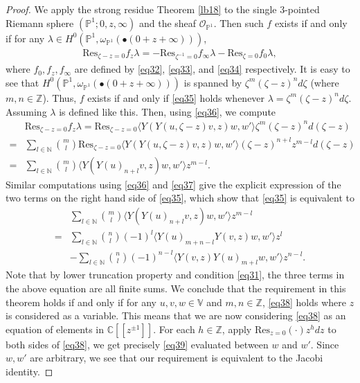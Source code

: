 \documentclass[12pt,b5paper,notitlepage]{report}
\theoremstyle{definition}
\theoremstyle{plain}
\newcommand{\Res}{\mathrm{Res}}
\newcommand{\bk}[1]{\langle {#1}\rangle}
\newcommand{\scr}{\mathscr}
\newcommand{\mbb}{\mathbb}
\newcommand{\blt}{\bullet}
\newcommand{\Nbb}{\mathbb N}
\numberwithin{equation}{section}
\begin{document}
\begin{proof}
We apply the strong residue Theorem \ref{lb18} to the  single $3$-pointed Riemann sphere $(\mbb P^1;0,z,\infty)$ and the sheaf $\scr O_{\mbb P^1}$. Then such $f$ exists if and only if for any $\lambda\in H^0(\mbb P^1,\omega_{\mbb P^1}(\blt(0+z+\infty)))$,
\begin{align}
\Res_{\zeta-z=0}f_z\lambda=-\Res_{\zeta^{-1}=0} f_\infty\lambda-\Res_{\zeta=0}f_0\lambda,\label{eq35}
\end{align}
where $f_0,f_z,f_\infty$ are defined by  \eqref{eq32}, \eqref{eq33}, and \eqref{eq34} respectively. It is easy to see that $H^0(\mbb P^1,\omega_{\mbb P^1}(\blt(0+z+\infty)))$ is spanned by $\zeta^m(\zeta-z)^nd\zeta$ (where $m,n\in\mbb Z$). Thus, $f$ exists if and only if \eqref{eq35} holds whenever $\lambda=\zeta^m(\zeta-z)^nd\zeta$. Assuming $\lambda$ is defined like this. Then, using \eqref{eq36}, we compute
\begin{align*}
&\Res_{\zeta-z=0}f_z\lambda=\Res_{\zeta-z=0}\bk{Y(Y(u,\zeta-z)v,z)w,w'}\zeta^m(\zeta-z)^nd(\zeta-z)\\
=&\sum_{l\in\Nbb}{m\choose l}\Res_{\zeta-z=0}\bk{Y(Y(u,\zeta-z)v,z)w,w'}(\zeta-z)^{n+l}z^{m-l}d(\zeta-z)\\
=&\sum_{l\in\Nbb}{m\choose l}\bk{Y(Y(u)_{n+l}v,z)w,w'}z^{m-l}.
\end{align*}
Similar computations using \eqref{eq36} and \eqref{eq37} give the explicit expression of the two terms on the right hand side of \eqref{eq35}, which show that \eqref{eq35} is equivalent to
\begin{align}
&\sum_{l\in\Nbb}{m\choose l}\bk{Y(Y(u)_{n+l}v,z)w,w'}z^{m-l}\nonumber\\
=&\sum_{l\in\Nbb}{n\choose l}(-1)^l\bk{Y(u)_{m+n-l}Y(v,z)w,w'}z^l\nonumber\\
&-\sum_{l\in\Nbb}{n\choose l}(-1)^{n-l}\bk{Y(v,z)Y(u)_{m+l}w,w'}z^{n-l}.\label{eq38}
\end{align}
Note that by lower truncation property and condition \eqref{eq31}, the three terms in the above equation are all finite sums. We conclude that the requirement in this theorem holds if and only if for any $u,v,w\in\mbb V$ and $m,n\in\mbb Z$, \eqref{eq38} holds where $z$ is considered as a variable. This means that  we are now considering \eqref{eq38} as an equation of elements in $\mbb C[[z^{\pm 1}]]$. For each $h\in\mbb Z$, apply $\Res_{z=0}(\cdot)z^hdz$ to both sides of \eqref{eq38}, we get precisely \eqref{eq39} evaluated between $w$ and $w'$. Since $w,w'$ are arbitrary, we see that our requirement is equivalent to the Jacobi identity.
\end{proof}
\end{document}
